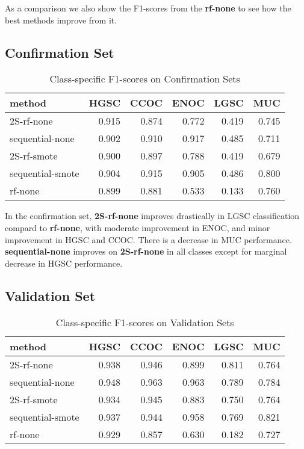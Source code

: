 \documentclass[
]{report}
\begin{document}
As a comparison we also show the F1-scores from the \textbf{rf-none} to see how the best methods improve from it.

\hypertarget{confirmation-set}{%
\subsection{Confirmation Set}\label{confirmation-set}}

\begin{table}

\caption{\label{tab:confirmation-set}Class-specific F1-scores on Confirmation Sets}
\centering
\begin{tabular}[t]{l|r|r|r|r|r}
\hline
method & HGSC & CCOC & ENOC & LGSC & MUC\\
\hline
2S-rf-none & 0.915 & 0.874 & 0.772 & 0.419 & 0.745\\
\hline
sequential-none & 0.902 & 0.910 & 0.917 & 0.485 & 0.711\\
\hline
2S-rf-smote & 0.900 & 0.897 & 0.788 & 0.419 & 0.679\\
\hline
sequential-smote & 0.904 & 0.915 & 0.905 & 0.486 & 0.800\\
\hline
rf-none & 0.899 & 0.881 & 0.533 & 0.133 & 0.760\\
\hline
\end{tabular}
\end{table}

In the confirmation set, \textbf{2S-rf-none} improves drastically in LGSC classification compard to \textbf{rf-none}, with moderate improvement in ENOC, and minor improvement in HGSC and CCOC. There is a decrease in MUC performance. \textbf{sequential-none} improves on \textbf{2S-rf-none} in all classes except for marginal decrease in HGSC performance.

\hypertarget{validation-set}{%
\subsection{Validation Set}\label{validation-set}}

\begin{table}

\caption{\label{tab:validation-set}Class-specific F1-scores on Validation Sets}
\centering
\begin{tabular}[t]{l|r|r|r|r|r}
\hline
method & HGSC & CCOC & ENOC & LGSC & MUC\\
\hline
2S-rf-none & 0.938 & 0.946 & 0.899 & 0.811 & 0.764\\
\hline
sequential-none & 0.948 & 0.963 & 0.963 & 0.789 & 0.784\\
\hline
2S-rf-smote & 0.934 & 0.945 & 0.883 & 0.750 & 0.764\\
\hline
sequential-smote & 0.937 & 0.944 & 0.958 & 0.769 & 0.821\\
\hline
rf-none & 0.929 & 0.857 & 0.630 & 0.182 & 0.727\\
\hline
\end{tabular}
\end{table}
\end{document}
